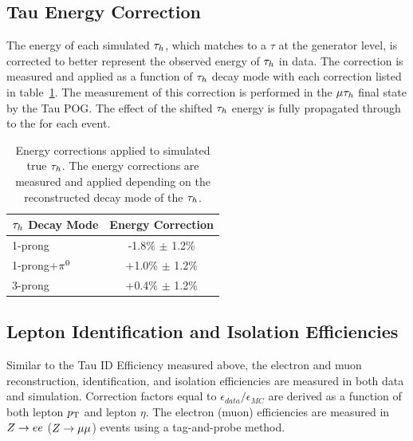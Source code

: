 \subsection{Tau Energy Correction}
\label{sec:htt_tec}
The energy of each simulated $\tau_{h}$, which matches to a $\tau$ at the generator level, is corrected
to better represent the observed energy of $\tau_{h}$ in data. The correction is measured and applied
as a function of $\tau_{h}$ decay mode with each correction listed in table~\ref{tab:htt_tec}. The measurement
of this correction is performed in the $\mu\tau_{h}$ final state by the Tau POG. The effect of
the shifted $\tau_{h}$ energy is fully propagated through to the \etvecmiss for each event.

\begin{table}[htbp]
\centering
\begin{tabular}{|l|c|}
\hline
$\tau_{h}$ Decay Mode   &   Energy Correction   \\
\hline
1-prong            &   -1.8\%  $\pm$ 1.2\%  \\
1-prong+$\pi^{0}$    &   +1.0\%  $\pm$ 1.2\%  \\
3-prong            &   +0.4\%  $\pm$ 1.2\%  \\  
\hline
\end{tabular}
\label{tab:htt_tec}
\caption{
Energy corrections applied to simulated true $\tau_{h}$. The energy corrections are measured
and applied depending on the reconstructed decay mode of the $\tau_{h}$.
}
\end{table}



\subsection{Lepton Identification and Isolation Efficiencies}
Similar to the Tau ID Efficiency measured above, the electron and muon reconstruction, identification,
and isolation efficiencies are measured in both data and simulation. Correction factors equal to
$\epsilon_{data}/\epsilon_{MC}$ are derived as a function of both lepton $p_\mathrm{T}$ and lepton $\eta$.
The electron (muon) efficiencies are measured in $Z\to ee$ ($Z\to\mu\mu$) events using a tag-and-probe
method.


